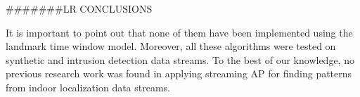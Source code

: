 









#######LR CONCLUSIONS

It is important to point out that none of them have been implemented using the landmark time window model. Moreover, all these algorithms were tested on synthetic and intrusion detection data streams. To the best of our knowledge, no previous research work was found in applying streaming AP for finding patterns from indoor localization data streams.

